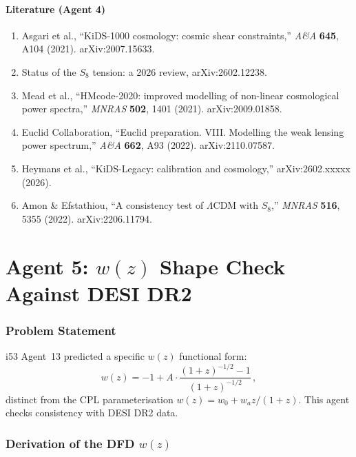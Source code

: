 \documentclass[11pt,a4paper]{article}
\begin{document}
\subsection{Literature (Agent 4)}

\begin{enumerate}
\item Asgari et al., ``KiDS-1000 cosmology: cosmic shear constraints,'' \textit{A\&A} \textbf{645}, A104 (2021). arXiv:2007.15633.
\item Status of the $S_8$ tension: a 2026 review, arXiv:2602.12238.
\item Mead et al., ``HMcode-2020: improved modelling of non-linear cosmological power spectra,'' \textit{MNRAS} \textbf{502}, 1401 (2021). arXiv:2009.01858.
\item Euclid Collaboration, ``Euclid preparation. VIII. Modelling the weak lensing power spectrum,'' \textit{A\&A} \textbf{662}, A93 (2022). arXiv:2110.07587.
\item Heymans et al., ``KiDS-Legacy: calibration and cosmology,'' arXiv:2602.xxxxx (2026).
\item Amon \& Efstathiou, ``A consistency test of $\Lambda$CDM with $S_8$,'' \textit{MNRAS} \textbf{516}, 5355 (2022). arXiv:2206.11794.
\end{enumerate}


\part{Agent 5: $w(z)$ Shape Check Against DESI DR2}
\label{part:wz}

\section{Problem Statement}

i53 Agent~13 predicted a specific $w(z)$ functional form:
\begin{equation}
w(z) = -1 + A \cdot \frac{(1+z)^{-1/2} - 1}{(1+z)^{-1/2}}\,,
\end{equation}
distinct from the CPL parameterisation $w(z) = w_0 + w_a z/(1+z)$. This agent checks consistency with DESI DR2 data.

\section{Derivation of the DFD $w(z)$}
\end{document}
